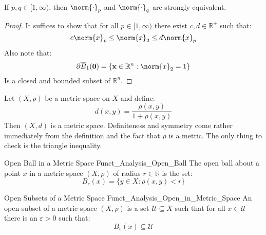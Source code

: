 \documentclass[crop=false,class=book,oneside]{standalone}                      %
\begin{document}
            \begin{theorem}
                If $p,q\in[1,\infty)$, then $\norm{\cdot}_{p}$ and
                $\norm{\cdot}_{q}$ are strongly equivalent.
            \end{theorem}
            \begin{proof}
                It suffices to show that for all
                $p\in[1,\infty)$ there exist
                $c,d\in\mathbb{R}^{+}$ such that:
                \begin{equation}
                    c\norm{x}_{p}\leq\norm{x}_{2}\leq{d}\norm{x}_{p}
                \end{equation}
                Also note that:
                \begin{equation}
                    \partial{\overline{B}_{1}(\mathbf{0})}=
                    \{\mathbf{x}\in\mathbb{R}^{n}:\norm{x}_{2}=1\}
                \end{equation}
                Is a closed and bounded subset of $\mathbb{R}^{n}$.
            \end{proof}
            \begin{lexample}
                Let $(X,\rho)$ be a metric space on $X$ and define:
                \begin{equation}
                    d(x,y)=\frac{\rho(x,y)}{1+\rho(x,y)}
                \end{equation}
                Then $(X,d)$ is a metric space. Definiteness
                and symmetry come rather immediately from the
                definition and the fact that $\rho$ is a metric.
                The only thing to check is the
                triangle inequality.
            \end{lexample}
            \begin{ldefinition}{Open Ball in a Metric Space}
                  {Funct_Analysis_Open_Ball}
                The open ball about a point $x$ in a metric space
                $(X,\rho)$ of radius $r\in\mathbb{R}$ is the set:
                \begin{equation}
                    B_{r}(x)=\{y\in{X}:\rho(x,y)<r\}
                \end{equation}
            \end{ldefinition}
            \begin{ldefinition}{Open Subsets of a Metric Space}
                  {Funct_Analysis_Open_in_Metric_Space}
                An open subset of a metric space $(X,\rho)$ is a set
                $\mathcal{U}\subseteq{X}$ such that for all
                $x\in\mathcal{U}$ there is an $\varepsilon>0$
                such that:
                \begin{equation}
                    B_{\varepsilon}(x)\subseteq\mathcal{U}
                \end{equation}
            \end{ldefinition}
\end{document}
